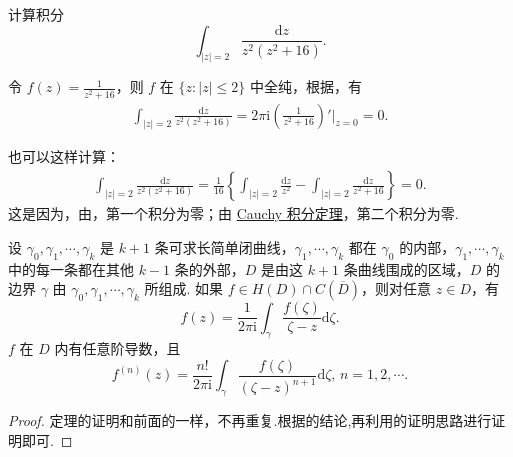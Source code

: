 \documentclass[../../main.tex]{subfiles}%
\begin{document}
\begin{example}
计算积分
\[
\int_{|z| = 2} \frac{\mathrm{d}z}{z^2(z^2 + 16)}.
\]
\end{example}
\begin{solution}
令 \( f(z) = \frac{1}{z^2 + 16} \)，则 \( f \) 在 \( \{z: |z| \leqslant 2\} \) 中全纯，根据，有
\begin{align*}
\int_{|z| = 2} \frac{\mathrm{d}z}{z^2(z^2 + 16)} = 2\pi \mathrm{i} \left( \frac{1}{z^2 + 16} \right)' \bigg|_{z = 0} = 0.
\end{align*}

也可以这样计算：
\begin{align*}
\int_{|z| = 2} \frac{\mathrm{d}z}{z^2(z^2 + 16)} = \frac{1}{16} \left\{ \int_{|z| = 2} \frac{\mathrm{d}z}{z^2} - \int_{|z| = 2} \frac{\mathrm{d}z}{z^2 + 16} \right\} = 0.
\end{align*}
这是因为，由，第一个积分为零；由 \hyperref[theorem:Cauchy-Goursat定理(Cauchy积分定理)]{Cauchy 积分定理}，第二个积分为零. 

\end{solution}

\begin{theorem}\label{theorem:定理3.4.6}
设 \( \gamma_0, \gamma_1, \cdots, \gamma_k \) 是 \( k + 1 \) 条可求长简单闭曲线，\( \gamma_1, \cdots, \gamma_k \) 都在 \( \gamma_0 \) 的内部，\( \gamma_1, \cdots, \gamma_k \) 中的每一条都在其他 \( k - 1 \) 条的外部，\( D \) 是由这 \( k + 1 \) 条曲线围成的区域，\( D \) 的边界 \( \gamma \) 由 \( \gamma_0, \gamma_1, \cdots, \gamma_k \) 所组成. 如果 \( f \in H(D) \cap C(\overline{D}) \)，则对任意 \( z \in D \)，有
\[
f(z) = \frac{1}{2\pi \mathrm{i}} \int_{\gamma} \frac{f(\zeta)}{\zeta - z} \mathrm{d}\zeta.
\]
\( f \) 在 \( D \) 内有任意阶导数，且
\[
f^{(n)}(z) = \frac{n!}{2\pi \mathrm{i}} \int_{\gamma} \frac{f(\zeta)}{(\zeta - z)^{n + 1}} \mathrm{d}\zeta, \, n = 1, 2, \cdots.
\]
\end{theorem}
\begin{proof}
定理的证明和前面的一样，不再重复.根据的结论,再利用的证明思路进行证明即可.
\end{proof}
\end{document}
